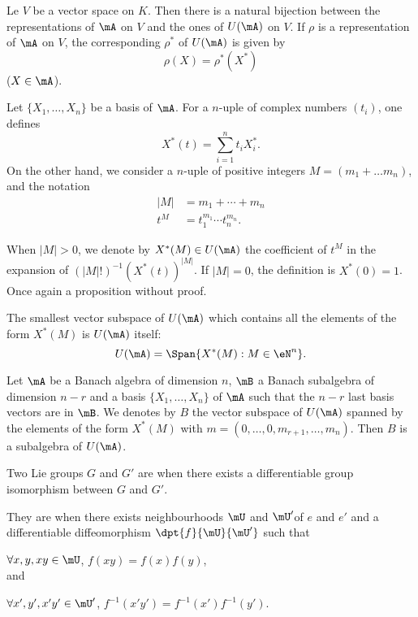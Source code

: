 \begin{proposition}
Le $V$ be a vector space on $K$. Then there is a natural bijection between the representations of $\mA$ on $V$ and the ones of $U(\mA)$ on $V$. If $\rho$ is a representation of $\mA$ on $V$, the corresponding $\rho^*$ of $U(\mA)$ is given by
\[
   \rho(X)=\rho^*(X^*)
\]
($X\in\mA$).
\end{proposition}

Let $\{X_1,\ldots,X_n\}$ be a basis of $\mA$. For a $n$-uple of complex numbers $(t_i)$, one defines
\begin{equation}
X^*(t)=\sum_{i=1}^nt_iX^*_i.
\end{equation}
On the other hand, we consider a $n$-uple of positive integers $M=(m_1+\ldots m_n)$, and the notation
\begin{equation}
\begin{split}
   |M|&=m_1+\cdots+m_n\\
   t^M&=t_1^{m_1}\cdots t_n^{m_n}.
\end{split}
\end{equation}

When $|M|>0$, we denote by $X^*(M)\in U(\mA)$ the coefficient of $t^M$ in the expansion of $(|M|!)^{-1} (X^*(t))^{|M|}$. If $|M|=0$, the definition is $X^*(0)=1$. Once again a proposition without proof.

\begin{proposition}
The smallest vector subspace of $U(\mA)$ which contains all the elements of the form $X^*(M)$ is $U(\mA)$ itself:
\[
   U(\mA)=\Span\{ X^*(M):M\in \eN^n \}.
\]
\end{proposition}

\begin{corollary} \label{cor:/24}
    Let $\mA$ be a Banach algebra of dimension $n$, $\mB$ a Banach subalgebra of dimension $n-r$ and a basis $\{X_1,\ldots,X_n\}$ of $\mA$ such that the $n-r$ last basis vectors are in $\mB$. We denotes by $B$ the vector subspace of $U(\mA)$ spanned by the elements of the form $X^*(M)$ with $m=(0,\ldots,0,m_{r+1},\ldots,m_n)$. Then $B$ is a subalgebra of $U(\mA)$.
\end{corollary}

\begin{definition}
Two Lie groups $G$ and $G'$ are  when there exists a differentiable group isomorphism between $G$ and $G'$.

They are  when there exists neighbourhoods $\mU$ and $\mU'$of $e$ and $e'$ and a differentiable diffeomorphism $\dpt{f}{\mU}{\mU'}$ such that

$\forall x,y,xy\in\mU$, $f(xy)=f(x)f(y)$, \\and

$\forall x',y',x'y'\in\mU'$, $f^{-1}(x'y')=f^{-1}(x')f^{-1}(y')$.
\end{definition}

